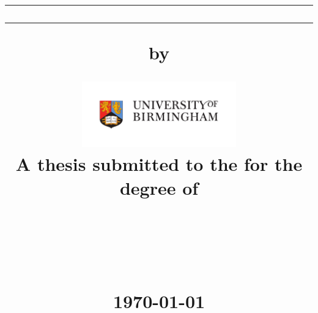 \title{

\begin{singlespacing}

\large

\vspace{-100pt}

\rule{\textwidth}{2pt}
\vfill\vfill
{\Huge\textbf{\thesistitle}}
\vfill
\rule{\textwidth}{2pt}

\vfill

by

\vfill

{\LARGE\authorname}

\vfill

\includegraphics[width=0.5\textwidth]{figures/frontmatter/logo}
\\
A thesis submitted to the {\university} for the degree of
\\
\textsc{\degreetitle}

\vfill

\begin{flushright}
\groupname
\\
\department
\\
\faculty
\\
\university
\vfill
\monthyear\today
\end{flushright}

\date{}

\end{singlespacing}

}
